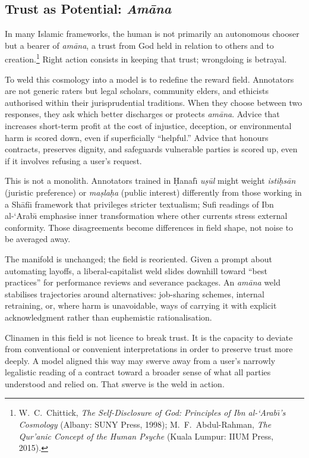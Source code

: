 \documentclass[12pt,a4paper]{article}
\begin{document}
\subsection{Trust as Potential: \emph{Am\=ana}}

In many Islamic frameworks, the human is not primarily an autonomous chooser but a bearer of \emph{am\=ana}, a trust from God held in relation to others and to creation.\footnote{W.~C.~Chittick, \emph{The Self-Disclosure of God: Principles of Ibn al-\textquoteleft Arab\={\i}'s Cosmology} (Albany: SUNY Press, 1998); M.~F.~Abdul-Rahman, \emph{The Qur'anic Concept of the Human Psyche} (Kuala Lumpur: IIUM Press, 2015).} Right action consists in keeping that trust; wrongdoing is betrayal.

To weld this cosmology into a model is to redefine the reward field. Annotators are not generic raters but legal scholars, community elders, and ethicists authorised within their jurisprudential traditions. When they choose between two responses, they ask which better discharges or protects \emph{am\=ana}. Advice that increases short-term profit at the cost of injustice, deception, or environmental harm is scored down, even if superficially ``helpful.'' Advice that honours contracts, preserves dignity, and safeguards vulnerable parties is scored up, even if it involves refusing a user's request.

This is not a monolith. Annotators trained in \d{H}anaf\={\i} \emph{u\d{s}\=ul} might weight \emph{isti\d{h}s\=an} (juristic preference) or \emph{ma\d{s}la\d{h}a} (public interest) differently from those working in a Sh\=afi\={\i} framework that privileges stricter textualism; Sufi readings of Ibn al-\textquoteleft Arab\={\i} emphasise inner transformation where other currents stress external conformity. Those disagreements become differences in field shape, not noise to be averaged away.

The manifold is unchanged; the field is reoriented. Given a prompt about automating layoffs, a liberal-capitalist weld slides downhill toward ``best practices'' for performance reviews and severance packages. An \emph{am\=ana} weld stabilises trajectories around alternatives: job-sharing schemes, internal retraining, or, where harm is unavoidable, ways of carrying it with explicit acknowledgment rather than euphemistic rationalisation.

Clinamen in this field is not licence to break trust. It is the capacity to deviate from conventional or convenient interpretations in order to preserve trust more deeply. A model aligned this way may swerve away from a user's narrowly legalistic reading of a contract toward a broader sense of what all parties understood and relied on. That swerve is the weld in action.
\end{document}
